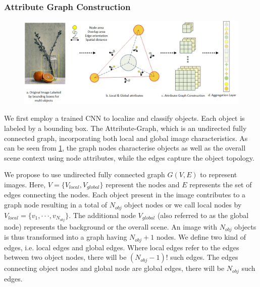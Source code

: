 \documentclass[10pt,twocolumn,letterpaper]{article}
\begin{document}
\subsubsection{Attribute Graph Construction}

\begin{figure}
	\centering
	\includegraphics[scale=0.5]{figures/layout_graph.jpg}
	\label{layout}
\end{figure}

We first employ a trained CNN to localize and classify objects. Each 
object is labeled by a bounding box. The Attribute-Graph, which is an 
undirected fully connected graph, incorporating both local and global 
image characteristics. As can be seen from \ref{layout},
the graph nodes characterise objects as well as the overall scene context using 
node attributes,  while the edges capture the object topology. 

We propose to use undirected fully connected graph $G(V,E)$ to represent images.
Here, $V = \{ {V_{local}},{V_{global}}\}$ represent the nodes and $E$ represents the set of edges connecting the nodes. Each object present in the image contributes to a graph node resulting in a total of $N_{obj}$ object nodes or we call local nodes by ${V_{local}} = \{ {v_1}, \cdot  \cdot  \cdot ,{v_{{N_{obj}}}}\} $. The additional node $V_{global}$ (also referred to as the global node) represents the background or the overall scene. An image with $N_{obj}$ objects is thus transformed into a graph having $N_{obj}+1$ nodes. We define two kind of edges, i.e. local edges and global edges. Where local edges refer to the edges between two object nodes, there will be $({N_{obj}} - 1)!$ such edges. The edges connecting object nodes and global node are global edges, there will be $N_{obj}$ such edges.
\end{document}
